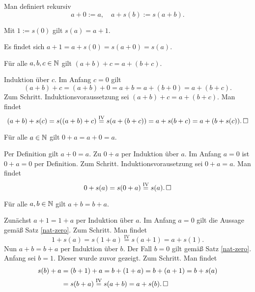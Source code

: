 \begin{Definition}\newlinefirst
Man definiert rekursiv
\[a+0 := a,\quad a + s(b) := s(a + b).\]
\end{Definition}

\begin{Satz}
Mit $1:=s(0)$ gilt $s(a) = a+1$.
\end{Satz}
\begin{Beweis}
Es findet sich $a+1 = a+s(0) = s(a+0) = s(a)$.\,\qedsymbol
\end{Beweis}

\begin{Satz}\newlinefirst
Für alle $a,b,c\in\mathbb N$ gilt $(a+b)+c = a+(b+c)$.
\end{Satz}
\begin{Beweis}
Induktion über $c$. Im Anfang $c=0$ gilt
\[(a+b)+c = (a+b)+0 = a+b = a+(b+0) = a+(b+c).\]
Zum Schritt. Induktionsvoraussetzung sei $(a+b)+c = a+(b+c)$. Man findet
\[(a+b)+s(c) = s((a+b)+c) \stackrel{\mathrm{IV}}= s(a+(b+c))
= a+s(b+c) = a+(b+s(c)).\,\square\]
\end{Beweis}

\newpage
\begin{Satz}%
\label{nat-zero}\newlinefirst
Für alle $a\in\mathbb N$ gilt $0+a = a+0 = a$.
\end{Satz}
\begin{Beweis}
Per Definition gilt $a+0=a$. Zu $0+a$ per Induktion über $a$.
Im Anfang $a=0$ ist $0+a = 0$ per Definition. Zum Schritt.
Induktionsvorausetzung sei $0+a=a$. Man findet
\[0+s(a) = s(0+a) \stackrel{\mathrm{IV}}= s(a).\,\square\]
\end{Beweis}


\begin{Satz}\newlinefirst
Für alle $a,b\in\mathbb N$ gilt $a+b = b+a$.
\end{Satz}
\begin{Beweis}
Zunächst $a+1 = 1+a$ per Induktion über $a$. Im Anfang $a=0$ gilt
die Aussage gemäß Satz \ref{nat-zero}. Zum Schritt. Man findet
\[1+s(a) = s(1+a) \stackrel{\mathrm{IV}}= s(a+1) = a+s(1).\]
Nun $a+b=b+a$ per Induktion über $b$. Der Fall $b=0$
gilt gemäß Satz \ref{nat-zero}. Anfang sei $b=1$. Dieser
wurde zuvor gezeigt. Zum Schritt. Man findet
\begin{align*}
s(b) + a &= (b+1)+a = b+(1+a) = b+(a+1) = b+s(a)\\
&= s(b+a)\stackrel{\mathrm{IV}}= s(a+b) = a+s(b).\,\square
\end{align*}
\end{Beweis}

